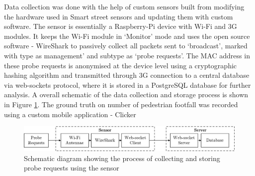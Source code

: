 Data collection was done with the help of custom sensors built from modifying the hardware used in Smart street sensors \citep{sss2016} and updating them with custom software.
The sensor is essentially a Raspberry-Pi device with Wi-Fi and 3G modules.
It keeps the Wi-Fi module in `Monitor' mode and uses the open source software - WireShark \citep{wireshark2} to passively collect all packets sent to `broadcast', marked with type as management' and subtype as `probe requests'.
The MAC address in these probe requests is anonymised at the device level using a cryptographic hashing algorithm and transmitted through 3G connection to a central database via web-sockets protocol, where it is stored in a PostgreSQL database for further analysis.
A overall schematic of the data collection and storage process is shown in Figure \ref{datacollection_schematic}.
The ground truth on number of pedestrian footfall was recorded using a custom mobile application - Clicker \citep{bala2018clicker}

\begin{figure}
	\centering
	\includegraphics[width=\linewidth]{images/datacollection_schematic.jpeg}
	\caption{Schematic diagram showing the process of collecting and storing probe requests using the sensor} \label{datacollection_schematic}
\end{figure}

